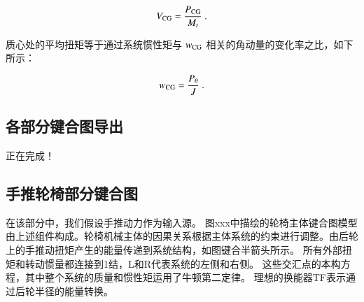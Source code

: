 	\begin{equation}
	\label{equ:V_CG}
	V_{\rm{CG}}
	=
	\frac{P_{\rm{CG}}}{M_t}
	\ .
	\end{equation}
	
	质心处的平均扭矩等于通过系统惯性矩与 $ w_{\rm{CG}} $ 相关的角动量的变化率之比，如下所示：
	
	\begin{equation}
	\label{equ:w_CG}
	w_{\rm{CG}}
	=
	\frac{P_{\theta}}{J}
	\ .
	\end{equation}

\subsection{各部分键合图导出}

	正在完成！

\subsection{手推轮椅部分键合图}

	在该部分中，我们假设手推动力作为输入源。
	{\color{blue} 图xxx}中描绘的轮椅主体键合图模型由上述组件构成。轮椅机械主体的因果关系根据主体系统的约束进行调整。由后轮上的手推动扭矩产生的能量传递到系统结构，如图键合半箭头所示。
	所有外部扭矩和转动惯量都连接到1结，L和R代表系统的左侧和右侧。 这些交汇点的本构方程，其中整个系统的质量和惯性矩运用了牛顿第二定律。
	理想的换能器TF表示通过后轮半径的能量转换。

